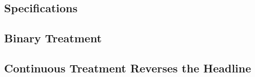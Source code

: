 \subsection{Specifications}\label{sec:b2b_leakage:spec}

%
%
%
%
%
%
%

\subsection{Binary Treatment}\label{sec:b2b_leakage:binary}


\subsection{Continuous Treatment Reverses the Headline}\label{sec:b2b_leakage:continuous}

